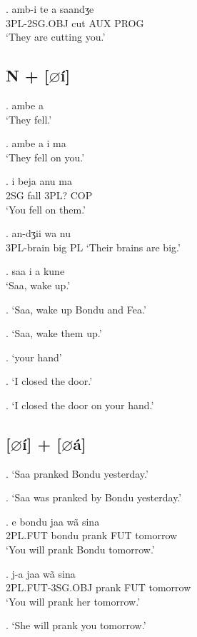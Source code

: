 \documentclass{assets/fieldnotes}
\begin{document}
\ex. amb-i te a saandʒe \\
3PL-2SG.OBJ cut AUX PROG \\
`They are cutting you.'

\subsection{N + [$\varnothing$í] }


\ex. ambe a \\
`They fell.'

\ex. ambe a i ma \\
`They fell on you.'

\exg. i beja anu ma \\
2SG fall 3PL? COP \\
`You fell on them.'

\exg. an-dʒii wa nu \\
3PL-brain big PL
`Their brains are big.'

\ex. saa i a kune \\
`Saa, wake up.'

\ex. `Saa, wake up Bondu and Fea.'

\ex. `Saa, wake them up.'

\ex. `your hand'

\ex. `I closed the door.'

\ex. `I closed the door on your hand.'

\subsection{[$\varnothing$í] + [$\varnothing$á]}

\ex. `Saa pranked Bondu yesterday.'

\ex. `Saa was pranked by Bondu yesterday.'


\exg. e bondu jaa wã sina \\
2PL.FUT bondu prank FUT tomorrow \\
`You will prank Bondu tomorrow.'

\ex. j-a jaa wã sina \\
2PL.FUT-3SG.OBJ prank FUT tomorrow \\
`You will prank her tomorrow.'


\ex. `She will prank you tomorrow.'
\end{document}
